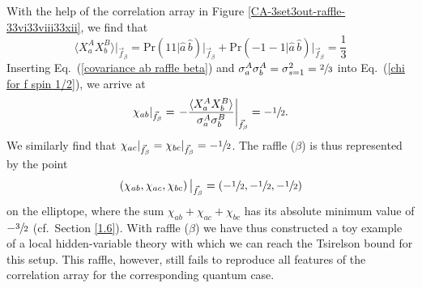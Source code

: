 With the help of the correlation array in Figure \ref{CA-3set3out-raffle-33vi33viii33xii}, we find that
\begin{equation}
\langle X^A_a X^B_b \rangle \big|_{\vec{f}_\beta} = \mathrm{Pr}(1 1| \hat{a} \,\hat{b}) \Big|_{\vec{f}_\beta} + \mathrm{Pr}(-1 -\!1| \hat{a} \,\hat{b}) \Big|_{\vec{f}_\beta} 
= \frac13
\label{covariance ab raffle beta}
\end{equation}
Inserting Eq.\ (\ref{covariance ab raffle beta}) and $\sigma^A_a \sigma^A_b = \sigma_{s=1}^2 = \sfrac23$ into Eq.\ (\ref{chi for f spin 1/2}), we arrive at 
\begin{equation}
 \chi_{ab} |_{\vec{f}_\beta} = \left. -\frac{\langle X^A_a X^B_b \rangle}{\sigma^A_a \sigma^B_b} \right|_{\vec{f}_\beta} = -\sfrac12.
\end{equation}
We similarly find that $ \chi_{ac} |_{\vec{f}_\beta} =  \chi_{bc} |_{\vec{f}_\beta} = -\sfrac12$. The raffle ($\beta$) is thus represented by the point 
\begin{equation}
\left( \chi_{ab}, \chi_{ac}, \chi_{bc} \right)  \big|_{\vec{f}_\beta} = \left(-\sfrac12, -\sfrac12, -\sfrac12 \right)
\label{raffle beta = -1/2^3}
\end{equation}
on the elliptope, where the sum $\chi_{ab} + \chi_{ac} + \chi_{bc}$ has its absolute minimum value of $-\sfrac32$ (cf.\ Section \ref{1.6}). With raffle ($\beta$) we have thus constructed a toy example of a local hidden-variable theory with which we can reach the Tsirelson bound  for this setup. This raffle, however, still fails to reproduce all features of the correlation array for the corresponding quantum case. 

